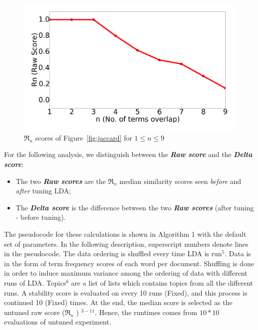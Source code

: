 \documentclass[twocolumn,5p,sort&compress]{elsarticle}
\newcommand{\bi}{\begin{itemize}}
\newcommand{\ei}{\end{itemize}}
\theoremstyle{break}
\begin{document}
  \begin{figure}[!h]
  \includegraphics[width=\linewidth]{./fig/alln.png}
  \caption{$\Re_n$ scores of 
  Figure~\ref{fig:jaccard} for $1 \le n \le 9$}
  \label{fig:alln}
\end{figure}

 For the following analysis,
we distinguish between the \textbf{\textit{Raw  score}} and the \textbf{\textit{Delta  score}}:
 \bi
\item The two \textbf{\textit{Raw  scores}} are the $\Re_n$ median similarity scores seen {\em before} and {\em after} tuning LDA;
\item The \textbf{\textit{Delta score}} is the difference between the two
  \textbf{\textit{Raw scores}} (after tuning - before tuning).  \ei 
  The pseudocode for these calculations
  is shown in Algorithm 1 with the default set of parameters. In the following
  description, superscript numbers denote lines in the pseudocode. The data ordering is
  shuffled every time LDA is run$^{5}$. Data is in the form of term frequency
  scores of each word per document. Shuffling is done in order to induce maximum
  variance among the ordering of data with  different runs of LDA. Topics$^{6}$ are a list of lists which
  contains topics from all the different runs. A stability score is evaluated on
  every 10 runs (Fixed), and this process is continued 10 (Fixed) times. At the end, the median
  score is selected as the untuned raw score ($\Re_n$ ) $^{3-11}$. Hence, the runtimes comes from $10 * 10$ evaluations of untuned experiment.
\end{document}
